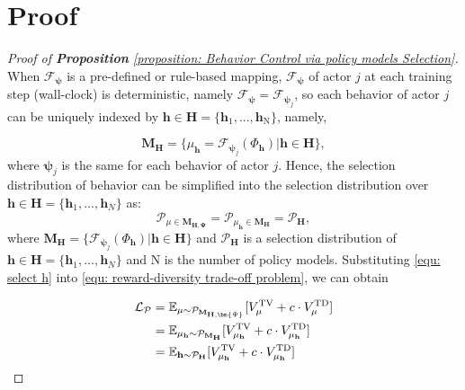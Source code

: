 \section{Proof}
\label{app: Proof}



\begin{proof}[Proof of \textbf{Proposition} \ref{proposition: Behavior Control via policy models Selection}]
\label{pf: pr 1}
When $\mathcal{F}_{\bm{\psi}}$ is a pre-defined or rule-based mapping, $\mathcal{F}_{\bm{\psi}}$ of actor $j$ at each training step (wall-clock) is deterministic, namely $\mathcal{F}_{\bm{\psi}} = \mathcal{F}_{\bm{\psi}_j}$, so each behavior of actor $j$ can be  uniquely indexed by $\mathbf{h} \in \mathbf{H}=\{\mathbf{h}_1,...,\mathbf{h}_\text{N}\}$, namely,

\begin{equation}
    \mathbf{M}_{\mathbf{H}} = \{\mu_{\mathbf{h}} = \mathcal{F}_{\bm{\psi}_j} (\Phi_\mathbf{h}) | \mathbf{h} \in \mathbf{H}\},
\end{equation}
where $\bm{\psi}_j$ is the same for each behavior of actor $j$. Hence, the selection distribution of behavior can be simplified into the selection distribution over $\mathbf{h} \in \mathbf{H}=\{\mathbf{h}_1,...,\mathbf{h}_N\}$ as:
\begin{equation}
\label{equ: select h}
    \mathcal{P}_{\mu \in \mathbf{M}_{\mathbf{H},\bm{\Psi}}} = \mathcal{P}_{\mu_\mathbf{h} \in \mathbf{M}_{\mathbf{H}}} = \mathcal{P}_\mathbf{H},
\end{equation}
where  $\mathbf{M}_{\mathbf{H}} = \{ \mathcal{F}_{\bm{\psi}_j} (\Phi_\mathbf{h}) | \mathbf{h} \in \mathbf{H}\}$ and $\mathcal{P}_{\mathbf{H}}$ is a selection distribution of $\mathbf{h} \in \mathbf{H}=\{\mathbf{h}_1,...,\mathbf{h}_N\}$ and $\mathrm{N}$ is the number of policy models.
Substituting \eqref{equ: select h} into \eqref{equ: reward-diversity trade-off problem}, we can obtain

\begin{equation*}
\setlength{\abovedisplayskip}{0.5pt}
\setlength{\belowdisplayskip}{0.5pt}
\begin{aligned}
        \mathcal{L}_{\mathcal{P}}
    & = 
    \mathbb{E}_{\mu \sim \mathcal{P}_{\mathbf{M}_{\mathbf{H},\bm{\Psi}}}}  [V^{\mathrm{TV}}_{\mu}+c \cdot V^{\mathrm{TD}}_{\mu}] \\
    &= \mathbb{E}_{\mu_\mathbf{h} \sim \mathcal{P}_{\mathbf{M}_\mathbf{H}}}  [V^{\mathrm{TV}}_{\mu_\mathbf{h}}+c \cdot V^{\mathrm{TD}}_{\mu_\mathbf{h}}] \\
    &= \mathbb{E}_{\mathbf{h} \sim \mathcal{P}_\mathbf{H}}  [V^{\mathrm{TV}}_{\mu_\mathbf{h}}+c \cdot V^{\mathrm{TD}}_{\mu_\mathbf{h}}] \\
\end{aligned}
\end{equation*}

\end{proof}

